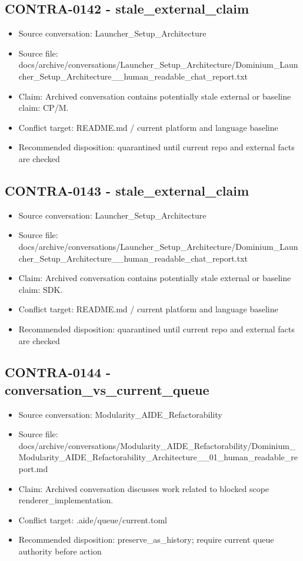 \documentclass[11pt,a4paper]{report}
\begin{document}
\subsection{CONTRA-0142 - stale\_external\_claim}

\begin{itemize}
\item Source conversation: Launcher\_Setup\_Architecture
\item Source file: docs/archive/conversations/Launcher\_Setup\_Architecture/Dominium\_Launcher\_Setup\_Architecture\_\_human\_readable\_chat\_report.txt
\item Claim: Archived conversation contains potentially stale external or baseline claim: CP/M.
\item Conflict target: README.md / current platform and language baseline
\item Recommended disposition: quarantined until current repo and external facts are checked
\end{itemize}

\subsection{CONTRA-0143 - stale\_external\_claim}

\begin{itemize}
\item Source conversation: Launcher\_Setup\_Architecture
\item Source file: docs/archive/conversations/Launcher\_Setup\_Architecture/Dominium\_Launcher\_Setup\_Architecture\_\_human\_readable\_chat\_report.txt
\item Claim: Archived conversation contains potentially stale external or baseline claim: SDK.
\item Conflict target: README.md / current platform and language baseline
\item Recommended disposition: quarantined until current repo and external facts are checked
\end{itemize}

\subsection{CONTRA-0144 - conversation\_vs\_current\_queue}

\begin{itemize}
\item Source conversation: Modularity\_AIDE\_Refactorability
\item Source file: docs/archive/conversations/Modularity\_AIDE\_Refactorability/Dominium\_Modularity\_AIDE\_Refactorability\_Architecture\_\_01\_human\_readable\_report.md
\item Claim: Archived conversation discusses work related to blocked scope renderer\_implementation.
\item Conflict target: .aide/queue/current.toml
\item Recommended disposition: preserve\_as\_history; require current queue authority before action
\end{itemize}
\end{document}
